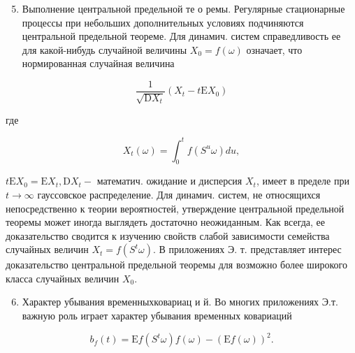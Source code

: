 \documentclass[10pt]{article}
\begin{document}
\begin{enumerate}

  \setcounter{enumi}{4}

  \item Выполнение центральной предельной те о ремы. Регулярные стационарные процессы при небольших дополнительных условиях подчиняются центральной предельной теореме. Для динамич. систем справедливость ее для какой-нибудь случайной величины $X_{0}=f(\omega)$ означает, что нормированная случайная величина

\end{enumerate}



\[

\frac{1}{\sqrt{\mathrm{D} X_{t}}}\left(X_{t}-t \mathrm{E} X_{0}\right)

\]



где



\[

X_{t}(\omega)=\int_{0}^{t} f\left(S^{u} \omega\right) d u,

\]



$t \mathrm{E} X_{0}=\mathrm{E} X_{t}, \mathrm{D} X_{t}-$ математич. ожидание и дисперсия $X_{t}$, имеет в пределе при $t \rightarrow \infty$ гауссовское распределение. Для динамич. систем, не относящихся непосредственно к теории вероятностей, утверждение центральной предельной теоремы может иногда выглядеть достаточно неожиданным. Как всегда, ее доказательство сводится к изучению свойств слабой зависимости семейства случайных величин $X_{t}=f\left(S^{t} \omega\right)$. В приложениях Э. т. представляет интерес доказательство центральной предельной теоремы для возможно более широкого класса случайных величин $X_{0}$.



\begin{enumerate}

  \setcounter{enumi}{5}

  \item Характер убывания временныхковариац и й. Во многих приложениях Э.т. важную роль играет характер убывания временных ковариаций

\end{enumerate}



\[

b_{f}(t)=\mathrm{E} f\left(S^{t} \omega\right) f(\omega)-(\mathrm{E} f(\omega))^{2} .

\]
\end{document}
